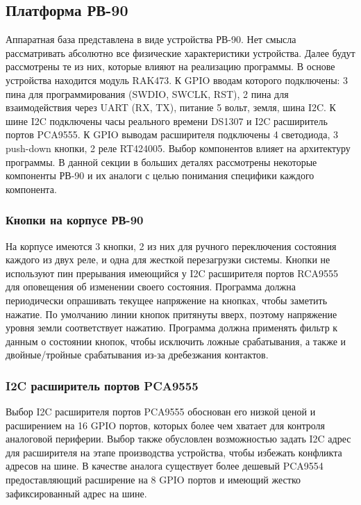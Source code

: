 


\newpage
\subsection{ Платформа РВ-90 }
Аппаратная база представлена в виде устройства РВ-90. Нет смысла рассматривать абсолютно все физические характеристики устройства. Далее будут рассмотрены те из них, которые влияют на реализацию программы. В основе устройства находится модуль RAK473. К GPIO вводам которого подключены: 3 пина для программирования (SWDIO, SWCLK, RST), 2 пина для взаимодействия через UART (RX, TX), питание 5 вольт, земля, шина I2C. К шине I2C подключены часы реального времени DS1307 и I2C расширитель портов PCA9555. К GPIO выводам расширителя подключены 4 светодиода, 3 push-down кнопки, 2 реле RT424005.
Выбор компонентов влияет на архитектуру программы. В данной секции в больших деталях рассмотрены некоторые компоненты РВ-90 и их аналоги с целью понимания специфики каждого компонента. 

\subsubsection{ Кнопки на корпусе РВ-90 }
На корпусе имеются 3 кнопки, 2 из них для ручного переключения состояния каждого из двух реле, и одна для жесткой перезагрузки системы.
Кнопки не используют пин прерывания имеющийся у I2C расширителя портов RCA9555 для оповещения об изменении своего состояния. Программа должна периодически опрашивать текущее напряжение на кнопках, чтобы заметить нажатие. По умолчанию линии кнопок притянуты вверх, поэтому напряжение уровня земли соответствует нажатию. Программа должна применять фильтр к данным о состоянии кнопок, чтобы исключить ложные срабатывания, а также и двойные/тройные срабатывания из-за дребезжания контактов. 

\subsubsection{ I2C расширитель портов PCA9555} 
Выбор I2C расширителя портов PCA9555 обоснован его низкой ценой и расширением на 16 GPIO портов, которых более чем хватает для контроля аналоговой периферии. Выбор также обусловлен возможностью задать I2C адрес для расширителя на этапе производства устройства, чтобы избежать конфликта адресов на шине. В качестве аналога существует более дешевый PCA9554 предоставляющий расширение на 8 GPIO портов и имеющий жестко зафиксированный адрес на шине. 

